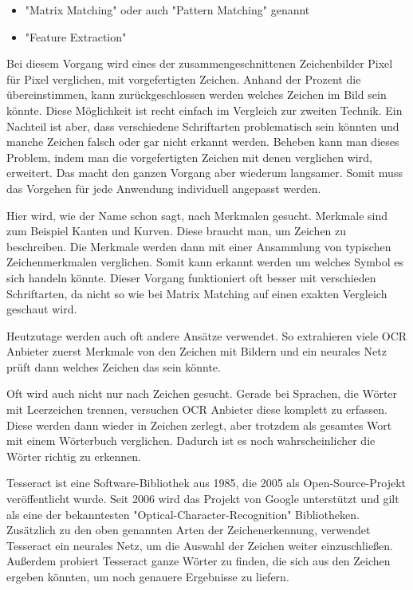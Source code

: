 \begin{itemize}
    \item "Matrix Matching" oder auch "Pattern Matching" genannt
    \item "Feature Extraction"
\end{itemize}


Bei diesem Vorgang wird eines der zusammengeschnittenen Zeichenbilder Pixel für Pixel verglichen, mit vorgefertigten Zeichen. Anhand der Prozent die übereinstimmen, kann zurückgeschlossen werden welches Zeichen im Bild sein könnte. Diese Möglichkeit ist recht einfach im Vergleich zur zweiten Technik. Ein Nachteil ist aber, dass verschiedene Schriftarten problematisch sein könnten und manche Zeichen falsch oder gar nicht erkannt werden. Beheben kann man dieses Problem, indem man die vorgefertigten Zeichen mit denen verglichen wird, erweitert. Das macht den ganzen Vorgang aber wiederum langsamer. Somit muss das Vorgehen für jede Anwendung individuell angepasst werden. \cite{OCRRecognition}


Hier wird, wie der Name schon sagt, nach Merkmalen gesucht. Merkmale sind zum Beispiel Kanten und Kurven. Diese braucht man, um Zeichen zu beschreiben. Die Merkmale werden dann mit einer Ansammlung von typischen Zeichenmerkmalen verglichen. Somit kann erkannt werden um welches Symbol es sich handeln könnte. Dieser Vorgang funktioniert oft besser mit verschieden Schriftarten, da nicht so wie bei Matrix Matching auf einen exakten Vergleich geschaut wird. \cite{OCRRecognition}


Heutzutage werden auch oft andere Ansätze verwendet. So extrahieren viele OCR Anbieter zuerst Merkmale von den Zeichen mit Bildern und ein neurales Netz prüft dann welches Zeichen das sein könnte.

Oft wird auch nicht nur nach Zeichen gesucht. Gerade bei Sprachen, die Wörter mit Leerzeichen trennen, versuchen OCR Anbieter diese komplett zu erfassen. Diese werden dann wieder in Zeichen zerlegt, aber trotzdem als gesamtes Wort mit einem Wörterbuch verglichen. Dadurch ist es noch wahrscheinlicher die Wörter richtig zu erkennen. 

\label{sec:tesseract}

Tesseract ist eine Software-Bibliothek aus 1985, die 2005 als Open-Source-Projekt veröffentlicht wurde. Seit 2006 wird das Projekt von Google unterstützt und gilt als eine der bekanntesten "Optical-Character-Recognition" Bibliotheken. Zusätzlich zu den oben genannten Arten der Zeichenerkennung, verwendet Tesseract ein neurales Netz, um die Auswahl der Zeichen weiter einzuschließen. Außerdem probiert Tesseract ganze Wörter zu finden, die sich aus den Zeichen ergeben könnten, um noch genauere Ergebnisse zu liefern. \cite{Tesseract}

